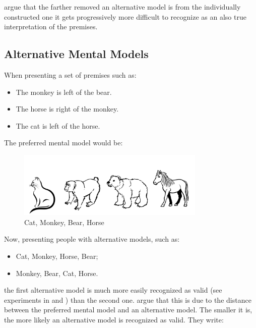 \documentclass[hidelinks]{scrartcl}
\begin{document}
\cite{Ragni.2013} argue that the farther removed an alternative model is from the individually constructed one it gets progressively more difficult to recognize as an also true interpretation of the \gls{premise}s.

\subsection{Alternative Mental Models} \label{section:alternative_mental_models}
When presenting a set of \gls{premise}s such as:

\begin{itemize}
\label{item:ambiguous}
\item The monkey is left of the bear.
\item The horse is right of the monkey.
\item The cat is left of the horse.
\end{itemize}

\noindent The preferred mental model would be:

\begin{figure}[H]
	\caption{Cat, Monkey, Bear, Horse}
	\label{fig:CMBH}
	\centering
	\includegraphics[width=0.8\textwidth]{Illustrations/animals_1.png}
\end{figure} 

\noindent Now, presenting people with alternative models, such as:

\begin{itemize}
\item Cat, Monkey, Horse, Bear;
\item Monkey, Bear, Cat, Horse.
\end{itemize}

the first alternative model is much more easily recognized as valid (see experiments in \cite{Ragni.2013} and \cite{Rauh.2005}) than the second one. \cite{Ragni.2013} argue that this is due to the distance between the preferred mental model and an alternative model. The smaller it is, the more likely an alternative model is recognized as valid. They write: 
\end{document}
